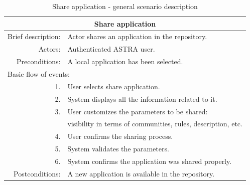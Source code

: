 \begin{table}[h!]
	\small
    \begin{center}
		\begin{tabular}{||r|l||}
		\hline \hline
		\multicolumn{2}{||c||}{\bfseries{Share application}} \\
		\hline
		\hline 
		Brief description: & Actor shares an application in the repository. \\
		\hline
		Actors: & Authenticated ASTRA user. \\
		\hline
		Preconditions: &  A local application has been selected. \\
		\hline \hline
		\multicolumn{2}{||l||}{Basic flow of events:} \\
		\hline \hline
			1. & User selects share application. \\
			2. & System displays all the information related to it. \\
			3. & User customizes the parameters to be shared: \\ 
			   & visibility in terms of communities, rules, description, etc.	\\ 
			4. & User confirms the sharing process. \\ 
			5. & System validates the parameters. \\
			6. & System confirms the application was shared properly. \\\hline \hline
		Postconditions: &  A new application is available in the repository. \\
		\hline \hline
		\end{tabular}
		\caption{\label{table:share-app} Share application - general scenario
		description}
	\end{center}
\end{table}

